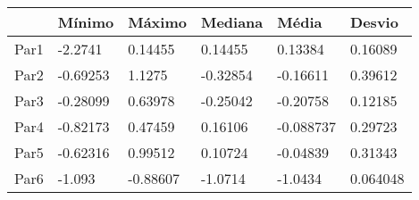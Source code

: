 \begin{tabular}{llllll}
& Mínimo & Máximo & Mediana & Média & Desvio \\ 
\hline 
Par1 & -2.2741 & 0.14455 & 0.14455 & 0.13384 & 0.16089 \\ 
Par2 & -0.69253 & 1.1275 & -0.32854 & -0.16611 & 0.39612 \\ 
Par3 & -0.28099 & 0.63978 & -0.25042 & -0.20758 & 0.12185 \\ 
Par4 & -0.82173 & 0.47459 & 0.16106 & -0.088737 & 0.29723 \\ 
Par5 & -0.62316 & 0.99512 & 0.10724 & -0.04839 & 0.31343 \\ 
Par6 & -1.093 & -0.88607 & -1.0714 & -1.0434 & 0.064048 \\ 
\hline 
\end{tabular}
